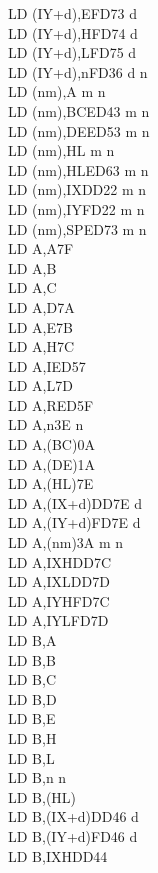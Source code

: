 \documentclass[12pt,twoside,openright,a4paper]{book}
\begin{document}
\begin{multicols}{3}
{\begin{tabbing}
		LD (IY+d),E\>FD73 d\\
		LD (IY+d),H\>FD74 d\\
		LD (IY+d),L\>FD75 d\\
		LD (IY+d),n\>FD36 d n\\
		LD (nm),A m n\\
		LD (nm),BC\>ED43 m n\\
		LD (nm),DE\>ED53 m n\\
		LD (nm),HL m n\\
		LD (nm),HL\>ED63 m n\\
		LD (nm),IX\>DD22 m n\\
		LD (nm),IY\>FD22 m n\\
		LD (nm),SP\>ED73 m n\\
		LD A,A\>7F\\
		LD A,B\\
		LD A,C\\
		LD A,D\>7A\\
		LD A,E\>7B\\
		LD A,H\>7C\\
		LD A,I\>ED57\\
		LD A,L\>7D\\
		LD A,R\>ED5F\\
		LD A,n\>3E n\\
		LD A,(BC)\>0A\\
		LD A,(DE)\>1A\\
		LD A,(HL)\>7E\\
		LD A,(IX+d)\>DD7E d\\
		LD A,(IY+d)\>FD7E d\\
		LD A,(nm)\>3A m n\\
		LD A,IXH\UNDOC\>DD7C\\
		LD A,IXL\UNDOC\>DD7D\\
		LD A,IYH\UNDOC\>FD7C\\
		LD A,IYL\UNDOC\>FD7D\\
		LD B,A\\
		LD B,B\\
		LD B,C\\
		LD B,D\\
		LD B,E\\
		LD B,H\\
		LD B,L\\
		LD B,n n\\
		LD B,(HL)\\
		LD B,(IX+d)\>DD46 d\\
		LD B,(IY+d)\>FD46 d\\
		LD B,IXH\UNDOC\>DD44\\

\end{tabbing}}
\end{multicols}
\end{document}
